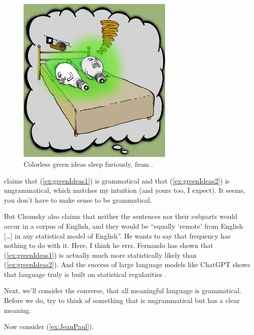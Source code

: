 \ea
    \label{ex:greenIdeas1}
    \label{ex:greenIdeas2}
    \z
    \label{ex:greenIdeas}
\z

\begin{figure}
    \centering
    \includegraphics[width=3in]{figures/green-ideas.jpg}
    \caption{Colorless green ideas sleep furiously, from \citep{parkvall2008limits}.}
    \label{fig:greenIdeas}
\end{figure}

\textcite[16]{Chomsky2002-ko} claims that (\ref{ex:greenIdeas1}) is grammatical and that (\ref{ex:greenIdeas2}) is ungrammatical, which matches my intuition (and yours too, I expect). It seems, you don't have to make sense to be grammatical.


But Chomsky also claims that neither the sentences nor their subparts would occur in a corpus of English, and they would be ``equally `remote' from English [\dots] in any statistical model of English''. He wants to say that frequency has nothing to do with it. Here, I think he errs. Fernando \textcite{Pereira2000} has shown that (\ref{ex:greenIdeas1}) is actually much more statistically likely than (\ref{ex:greenIdeas2}). And the success of large language models like ChatGPT shows that language truly is built on statistical regularities \citep{Kallini2024}.

Next, we'll consider the converse, that all meaningful language is grammatical. Before we do, try to think of something that is ungrammatical but has a clear meaning.

Now consider (\ref{ex:JeanPaul}).

\label{ex:JeanPaul}
\z


